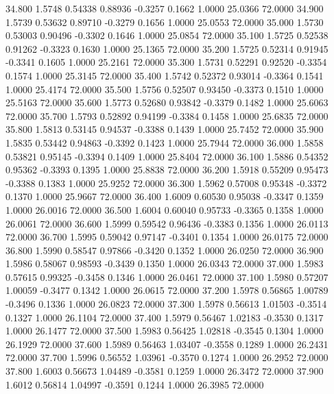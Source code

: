   34.800   1.5748   0.54338   0.88936  -0.3257   0.1662   1.0000  25.0366  72.0000
  34.900   1.5739   0.53632   0.89710  -0.3279   0.1656   1.0000  25.0553  72.0000
  35.000   1.5730   0.53003   0.90496  -0.3302   0.1646   1.0000  25.0854  72.0000
  35.100   1.5725   0.52538   0.91262  -0.3323   0.1630   1.0000  25.1365  72.0000
  35.200   1.5725   0.52314   0.91945  -0.3341   0.1605   1.0000  25.2161  72.0000
  35.300   1.5731   0.52291   0.92520  -0.3354   0.1574   1.0000  25.3145  72.0000
  35.400   1.5742   0.52372   0.93014  -0.3364   0.1541   1.0000  25.4174  72.0000
  35.500   1.5756   0.52507   0.93450  -0.3373   0.1510   1.0000  25.5163  72.0000
  35.600   1.5773   0.52680   0.93842  -0.3379   0.1482   1.0000  25.6063  72.0000
  35.700   1.5793   0.52892   0.94199  -0.3384   0.1458   1.0000  25.6835  72.0000
  35.800   1.5813   0.53145   0.94537  -0.3388   0.1439   1.0000  25.7452  72.0000
  35.900   1.5835   0.53442   0.94863  -0.3392   0.1423   1.0000  25.7944  72.0000
  36.000   1.5858   0.53821   0.95145  -0.3394   0.1409   1.0000  25.8404  72.0000
  36.100   1.5886   0.54352   0.95362  -0.3393   0.1395   1.0000  25.8838  72.0000
  36.200   1.5918   0.55209   0.95473  -0.3388   0.1383   1.0000  25.9252  72.0000
  36.300   1.5962   0.57008   0.95348  -0.3372   0.1370   1.0000  25.9667  72.0000
  36.400   1.6009   0.60530   0.95038  -0.3347   0.1359   1.0000  26.0016  72.0000
  36.500   1.6004   0.60040   0.95733  -0.3365   0.1358   1.0000  26.0061  72.0000
  36.600   1.5999   0.59542   0.96436  -0.3383   0.1356   1.0000  26.0113  72.0000
  36.700   1.5995   0.59042   0.97147  -0.3401   0.1354   1.0000  26.0175  72.0000
  36.800   1.5990   0.58547   0.97866  -0.3420   0.1352   1.0000  26.0250  72.0000
  36.900   1.5986   0.58067   0.98593  -0.3439   0.1350   1.0000  26.0343  72.0000
  37.000   1.5983   0.57615   0.99325  -0.3458   0.1346   1.0000  26.0461  72.0000
  37.100   1.5980   0.57207   1.00059  -0.3477   0.1342   1.0000  26.0615  72.0000
  37.200   1.5978   0.56865   1.00789  -0.3496   0.1336   1.0000  26.0823  72.0000
  37.300   1.5978   0.56613   1.01503  -0.3514   0.1327   1.0000  26.1104  72.0000
  37.400   1.5979   0.56467   1.02183  -0.3530   0.1317   1.0000  26.1477  72.0000
  37.500   1.5983   0.56425   1.02818  -0.3545   0.1304   1.0000  26.1929  72.0000
  37.600   1.5989   0.56463   1.03407  -0.3558   0.1289   1.0000  26.2431  72.0000
  37.700   1.5996   0.56552   1.03961  -0.3570   0.1274   1.0000  26.2952  72.0000
  37.800   1.6003   0.56673   1.04489  -0.3581   0.1259   1.0000  26.3472  72.0000
  37.900   1.6012   0.56814   1.04997  -0.3591   0.1244   1.0000  26.3985  72.0000
